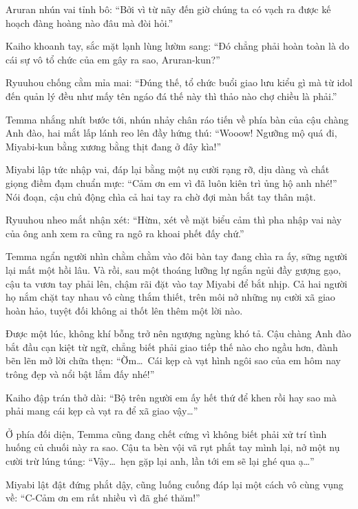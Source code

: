 \documentclass[../main.tex]{subfiles}
\begin{document}
Aruran nhún vai tỉnh bô: ``Bởi vì từ nãy đến giờ chúng ta có vạch ra được kế hoạch đàng hoàng nào đâu mà đòi hỏi.''

Kaiho khoanh tay, sắc mặt lạnh lùng lườm sang: ``Đó chẳng phải hoàn toàn là do cái sự vô tổ chức của em gây ra sao, Aruran-kun?''

Ryuuhou chống cằm mỉa mai: ``Đúng thế, tổ chức buổi giao lưu kiểu gì mà từ idol đến quản lý đều như mấy tên ngáo đá thế này thì thảo nào chợ chiều là phải.''

Temma nhắng nhít bước tới, nhún nhảy chân ráo tiến về phía bàn của cậu chàng Anh đào, hai mắt lấp lánh reo lên đầy hứng thú: ``Wooow! Ngưỡng mộ quá đi, Miyabi-kun bằng xương bằng thịt đang ở đây kìa!''


Miyabi lập tức nhập vai, đáp lại bằng một nụ cười rạng rỡ, dịu dàng và chất giọng điềm đạm chuẩn mực: ``Cảm ơn em vì đã luôn kiên trì ủng hộ anh nhé!'' Nói đoạn, cậu chủ động chìa cả hai tay ra chờ đợi màn bắt tay thân mật.

Ryuuhou nheo mắt nhận xét: ``Hừm, xét về mặt biểu cảm thì pha nhập vai này của ông anh xem ra cũng ra ngô ra khoai phết đấy chứ.''

Temma ngẩn người nhìn chằm chằm vào đôi bàn tay đang chìa ra ấy, sững người lại mất một hồi lâu. Và rồi, sau một thoáng lưỡng lự ngắn ngủi đầy gượng gạo, cậu ta vươn tay phải lên, chậm rãi đặt vào tay Miyabi để bắt nhịp. Cả hai người họ nắm chặt tay nhau vô cùng thắm thiết, trên môi nở những nụ cười xã giao hoàn hảo, tuyệt đối không ai thốt lên thêm một lời nào.


Được một lúc, không khí bỗng trở nên ngượng ngùng khó tả. Cậu chàng Anh đào bắt đầu cạn kiệt từ ngữ, chẳng biết phải giao tiếp thế nào cho ngầu hơn, đành bẽn lẽn mở lời chữa thẹn: ``Ờm\dots\ Cái kẹp cà vạt hình ngôi sao của em hôm nay trông đẹp và nổi bật lắm đấy nhé!''

Kaiho đập trán thở dài: ``Bộ trên người em ấy hết thứ để khen rồi hay sao mà phải mang cái kẹp cà vạt ra để xã giao vậy\dots''

Ở phía đối diện, Temma cũng đang chết cứng vì không biết phải xử trí tình huống củ chuối này ra sao. Cậu ta bèn vội vã rụt phắt tay mình lại, nở một nụ cười trừ lúng túng: ``Vậy\dots\ hẹn gặp lại anh, lần tới em sẽ lại ghé qua ạ\dots''

Miyabi lật đật đứng phắt dậy, cũng luống cuống đáp lại một cách vô cùng vụng về: ``C-Cảm ơn em rất nhiều vì đã ghé thăm!''
\end{document}
